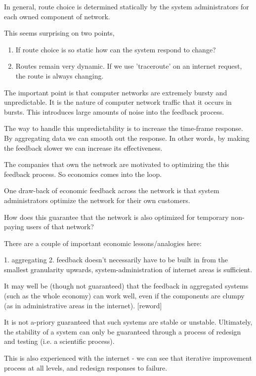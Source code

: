 In general, route choice is determined statically by the system administrators for each owned
component of network.  

This seems surprising on two points,

\begin{enumerate}
    \item If route choice is so static how can the system respond to change?
    \item Routes remain very dynamic. If we use 'traceroute' on an internet request, the route is
        always changing.
\end{enumerate}

The important point is that computer networks are extremely bursty and unpredictable. It is the
nature of computer network traffic that it occurs in bursts. This introduces large amounts of noise
into the feedback process. 

The way to handle this unpredictability is to increase the time-frame response. By aggregating data
we can smooth out the response. In other words, by making the feedback slower we can increase its
effectiveness.   

The companies that own the network are motivated to optimizing the this feedback process. So
economics comes into the loop.

One draw-back of economic feedback across the network is that system administrators optimize the
network for their own customers.

How does this guarantee that the network is also optimized for temporary non-paying users of that
network?



There are a couple of important economic lessons/analogies here:

1. aggregating    
2. feedback doesn't necessarily have to be built in from the smallest granularity upwards,
   system-administration of internet areas is sufficient.

It may well be (though not guaranteed) that the feedback in aggregated systems (such as the whole
economy) can work well, even if the components are clumpy (as in administrative areas in the
internet). [reword]

It is not a-priory guaranteed that such systems are stable or unstable. Ultimately, the stability of
a system can only be guaranteed through a process of redesign and testing (i.e. a scientific
process).

This is also experienced with the internet - we can see that iterative improvement process at all
levels, and redesign responses to failure.

